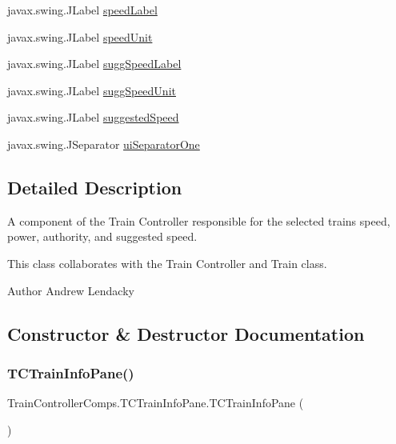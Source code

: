 \begin{DoxyCompactItemize}
\item 
javax.\+swing.\+J\+Label \hyperlink{classTrainControllerComps_1_1TCTrainInfoPane_a3ad3cc96e1a10e25ccec0524462cd1ec}{speed\+Label}
\item 
javax.\+swing.\+J\+Label \hyperlink{classTrainControllerComps_1_1TCTrainInfoPane_a8f20fe11080e6925e462f0876601a6da}{speed\+Unit}
\item 
javax.\+swing.\+J\+Label \hyperlink{classTrainControllerComps_1_1TCTrainInfoPane_a93e0c69b22525e4d1f97e3f725f7c8a1}{sugg\+Speed\+Label}
\item 
javax.\+swing.\+J\+Label \hyperlink{classTrainControllerComps_1_1TCTrainInfoPane_a595ef0eaa17bbdfc0c1f08a4850c8a9e}{sugg\+Speed\+Unit}
\item 
javax.\+swing.\+J\+Label \hyperlink{classTrainControllerComps_1_1TCTrainInfoPane_abc7d24f507a112d03fe323f853b9d4d3}{suggested\+Speed}
\item 
javax.\+swing.\+J\+Separator \hyperlink{classTrainControllerComps_1_1TCTrainInfoPane_a97285213bfc29bdda84e53054b83ed7b}{ui\+Separator\+One}
\end{DoxyCompactItemize}


\subsection{Detailed Description}
A component of the Train Controller responsible for the selected train\textquotesingle{}s speed, power, authority, and suggested speed. 

This class collaborates with the Train Controller and Train class.

\begin{DoxyAuthor}{Author}
Andrew Lendacky 
\end{DoxyAuthor}


\subsection{Constructor \& Destructor Documentation}
\mbox{\label{classTrainControllerComps_1_1TCTrainInfoPane_adb9f574b995a252e6e1fc1ee73402801}} 
\subsubsection{\texorpdfstring{T\+C\+Train\+Info\+Pane()}{TCTrainInfoPane()}}
{\footnotesize\ttfamily Train\+Controller\+Comps.\+T\+C\+Train\+Info\+Pane.\+T\+C\+Train\+Info\+Pane (\begin{DoxyParamCaption}{ }\end{DoxyParamCaption})}



